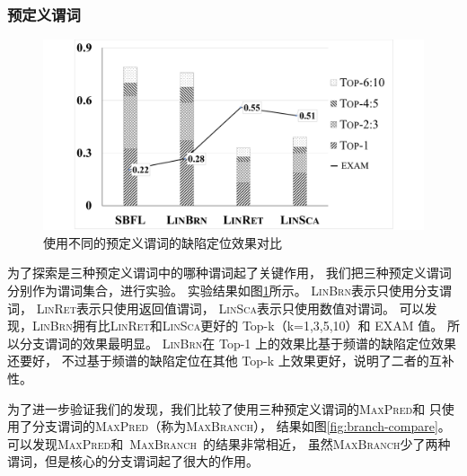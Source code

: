 
\subsubsection{预定义谓词}

\begin{figure}[htbp] 
\centering 
\includegraphics[width=12cm]{figure/diff-predictor-compare} 
\caption{使用不同的预定义谓词的缺陷定位效果对比} 
\label{fig:diff-predictor-compare}
\end{figure}

为了探索是三种预定义谓词中的哪种谓词起了关键作用，
我们把三种预定义谓词分别作为谓词集合，进行实验。
实验结果如图\ref{fig:diff-predictor-compare}所示。
\textsc{LinBrn}表示只使用分支谓词，
\textsc{LinRet}表示只使用返回值谓词，
\textsc{LinSca}表示只使用数值对谓词。
可以发现，\textsc{LinBrn}拥有比\textsc{LinRet}和\textsc{LinSca}更好的 Top-k（k=1,3,5,10）和 EXAM 值。
所以分支谓词的效果最明显。
\textsc{LinBrn}在 Top-1 上的效果比基于频谱的缺陷定位效果还要好，
不过基于频谱的缺陷定位在其他 Top-k 上效果更好，说明了二者的互补性。


为了进一步验证我们的发现，我们比较了使用三种预定义谓词的\textsc{MaxPred}和
只使用了分支谓词的\textsc{MaxPred}（称为\textsc{MaxBranch}），
结果如图\ref{fig:branch-compare}。
可以发现\textsc{MaxPred}和~\textsc{MaxBranch}~的结果非常相近，
虽然\textsc{MaxBranch}少了两种谓词，但是核心的分支谓词起了很大的作用。

